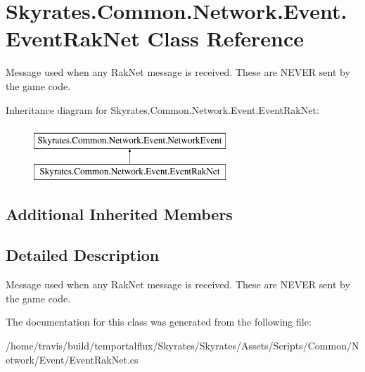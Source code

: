 \hypertarget{class_skyrates_1_1_common_1_1_network_1_1_event_1_1_event_rak_net}{\section{Skyrates.\-Common.\-Network.\-Event.\-Event\-Rak\-Net Class Reference}
\label{class_skyrates_1_1_common_1_1_network_1_1_event_1_1_event_rak_net}
}


Message used when any Rak\-Net message is received. These are N\-E\-V\-E\-R sent by the game code.  


Inheritance diagram for Skyrates.\-Common.\-Network.\-Event.\-Event\-Rak\-Net\-:\begin{figure}[H]
\begin{center}
\leavevmode
\includegraphics[height=2.000000cm]{class_skyrates_1_1_common_1_1_network_1_1_event_1_1_event_rak_net}
\end{center}
\end{figure}
\subsection*{Additional Inherited Members}


\subsection{Detailed Description}
Message used when any Rak\-Net message is received. These are N\-E\-V\-E\-R sent by the game code. 



The documentation for this class was generated from the following file\-:\begin{DoxyCompactItemize}
\item 
/home/travis/build/temportalflux/\-Skyrates/\-Skyrates/\-Assets/\-Scripts/\-Common/\-Network/\-Event/Event\-Rak\-Net.\-cs\end{DoxyCompactItemize}
